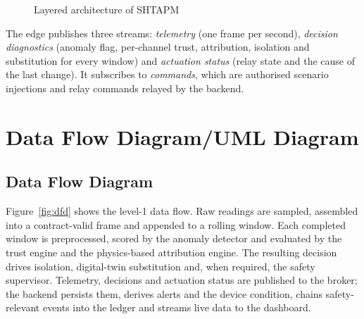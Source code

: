 \begin{figure}[htbp]
\caption{Layered architecture of SHTAPM}
\label{fig:architecture}
\end{figure}

The edge publishes three streams: \emph{telemetry} (one frame per second), \emph{decision diagnostics} (anomaly flag, per-channel trust, attribution, isolation and substitution for every window) and \emph{actuation status} (relay state and the cause of the last change). It subscribes to \emph{commands}, which are authorised scenario injections and relay commands relayed by the backend.

\section{Data Flow Diagram/UML Diagram}

\subsection{Data Flow Diagram}

Figure~\ref{fig:dfd} shows the level-1 data flow. Raw readings are sampled, assembled into a contract-valid frame and appended to a rolling window. Each completed window is preprocessed, scored by the anomaly detector and evaluated by the trust engine and the physics-based attribution engine. The resulting decision drives isolation, digital-twin substitution and, when required, the safety supervisor. Telemetry, decisions and actuation status are published to the broker; the backend persists them, derives alerts and the device condition, chains safety-relevant events into the ledger and streams live data to the dashboard.

